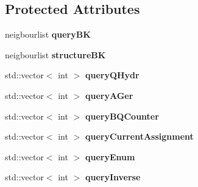 \subsection*{Protected Attributes}
\begin{DoxyCompactItemize}
\item 
\hypertarget{class_open_babel_1_1_t_edited_molecule_ae2caf879b28f821ab302ae51b48afea5}{neigbourlist {\bfseries query\-B\-K}}\label{class_open_babel_1_1_t_edited_molecule_ae2caf879b28f821ab302ae51b48afea5}

\item 
\hypertarget{class_open_babel_1_1_t_edited_molecule_a571ec293a53e5d8ec8352e6701d80ce3}{neigbourlist {\bfseries structure\-B\-K}}\label{class_open_babel_1_1_t_edited_molecule_a571ec293a53e5d8ec8352e6701d80ce3}

\item 
\hypertarget{class_open_babel_1_1_t_edited_molecule_a0b50dfd0ca564e80fbc9489b07c1bfb4}{std\-::vector$<$ int $>$ {\bfseries query\-Q\-Hydr}}\label{class_open_babel_1_1_t_edited_molecule_a0b50dfd0ca564e80fbc9489b07c1bfb4}

\item 
\hypertarget{class_open_babel_1_1_t_edited_molecule_a25589f5998268cce22efe1ad7a5cded6}{std\-::vector$<$ int $>$ {\bfseries query\-A\-Ger}}\label{class_open_babel_1_1_t_edited_molecule_a25589f5998268cce22efe1ad7a5cded6}

\item 
\hypertarget{class_open_babel_1_1_t_edited_molecule_a66cc75c3e0439a54a832f69872ce7d73}{std\-::vector$<$ int $>$ {\bfseries query\-B\-Q\-Counter}}\label{class_open_babel_1_1_t_edited_molecule_a66cc75c3e0439a54a832f69872ce7d73}

\item 
\hypertarget{class_open_babel_1_1_t_edited_molecule_a042be5bae83e4b4b2d22e81b5c33e015}{std\-::vector$<$ int $>$ {\bfseries query\-Current\-Assignment}}\label{class_open_babel_1_1_t_edited_molecule_a042be5bae83e4b4b2d22e81b5c33e015}

\item 
\hypertarget{class_open_babel_1_1_t_edited_molecule_a6386b7116cb2aaa1fb765ae56c1e38b2}{std\-::vector$<$ int $>$ {\bfseries query\-Enum}}\label{class_open_babel_1_1_t_edited_molecule_a6386b7116cb2aaa1fb765ae56c1e38b2}

\item 
\hypertarget{class_open_babel_1_1_t_edited_molecule_a17cf210bf5d8e7e992ca26175da74efb}{std\-::vector$<$ int $>$ {\bfseries query\-Inverse}}\label{class_open_babel_1_1_t_edited_molecule_a17cf210bf5d8e7e992ca26175da74efb}


\end{DoxyCompactItemize}
